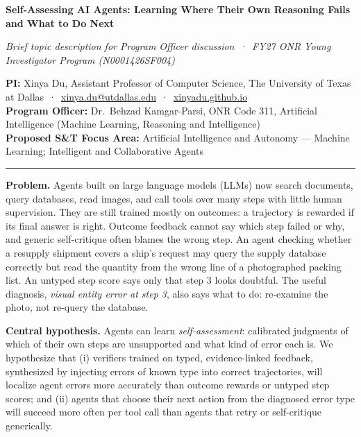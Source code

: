\documentclass[11pt]{article}
\newcommand{\head}[1]{{\color{navy}\textbf{#1}}\enspace}
\newcommand{\POline}{Dr.\ Behzad Kamgar-Parsi, ONR Code 311, Artificial Intelligence (Machine Learning, Reasoning and Intelligence)}
\newcommand{\FocusArea}{Artificial Intelligence and Autonomy --- Machine Learning; Intelligent and Collaborative Agents}
\begin{document}
\begin{center}
{\fontsize{15.5}{18.5}\selectfont\bfseries\color{navy} Self-Assessing AI Agents: Learning Where Their Own Reasoning Fails\\[1pt] and What to Do Next\par}
\vspace{3pt}
{\small\itshape Brief topic description for Program Officer discussion \,·\, FY27 ONR Young Investigator Program (N0001426SF004)\par}
\end{center}
\vspace{-2pt}
{\small
\textbf{PI:} Xinya Du, Assistant Professor of Computer Science, The University of Texas at Dallas \,·\, \href{mailto:xinya.du@utdallas.edu}{xinya.du@utdallas.edu} \,·\, \href{https://xinyadu.github.io}{xinyadu.github.io}\\
\textbf{Program Officer:} \POline\\
\textbf{Proposed S\&T Focus Area:} \FocusArea\par}
\vspace{-3pt}
{\color{navy}\rule{\linewidth}{0.6pt}}

\head{Problem.} Agents built on large language models (LLMs) now search documents, query databases, read images, and call tools over many steps with little human supervision. They are still trained mostly on outcomes: a trajectory is rewarded if its final answer is right. Outcome feedback cannot say which step failed or why, and generic self-critique often blames the wrong step. An agent checking whether a resupply shipment covers a ship's request may query the supply database correctly but read the quantity from the wrong line of a photographed packing list. An untyped step score says only that step 3 looks doubtful. The useful diagnosis, \emph{visual entity error at step 3}, also says what to do: re-examine the photo, not re-query the database.

\head{Central hypothesis.} Agents can learn \emph{self-assessment}: calibrated judgments of which of their own steps are unsupported and what kind of error each is. We hypothesize that (i) verifiers trained on typed, evidence-linked feedback, synthesized by injecting errors of known type into correct trajectories, will localize agent errors more accurately than outcome rewards or untyped step scores; and (ii) agents that choose their next action from the diagnosed error type will succeed more often per tool call than agents that retry or self-critique generically.
\end{document}
